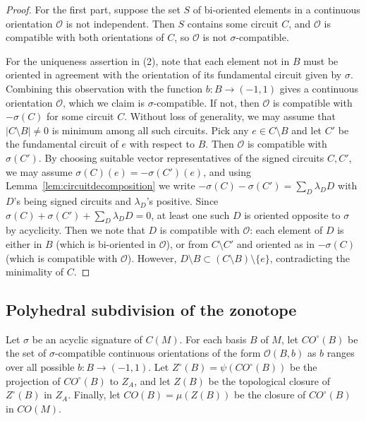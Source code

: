 \documentclass[12pt]{amsart}
\numberwithin{equation}{section}
\theoremstyle{definition}
\begin{document}
\begin{proof} For the first part, suppose the set $S$ of bi-oriented elements in a continuous orientation $\mathcal{O}$ is not independent. Then $S$ contains some circuit $C$, and $\mathcal{O}$ is compatible with both orientations of $C$, so $\mathcal{O}$ is not $\sigma$-compatible.

For the uniqueness assertion in (2), note that each element not in $B$ must be oriented in agreement with the orientation of its fundamental circuit given by $\sigma$. 
Combining this observation with the function $b : B \to (-1,1)$ gives a continuous orientation $\mathcal{O}$, which we claim is $\sigma$-compatible. If not, then $\mathcal{O}$ is compatible with $-\sigma(C)$ for some circuit $C$. Without loss of generality, we may assume that $|C\setminus B|\neq 0$ is minimum among all such circuits. Pick any $e\in C\setminus B$ and let $C'$ be the fundamental circuit of $e$ with respect to $B$. Then $\mathcal{O}$ is compatible with $\sigma(C')$. By choosing suitable vector representatives of the signed circuits $C,C'$, we may assume $\sigma(C)(e)=-\sigma(C')(e)$, and using Lemma~\ref{lem:circuitdecomposition} we write $-\sigma(C)-\sigma(C')=\sum_{D} \lambda_D D$ with $D$'s being signed circuits and $\lambda_D$'s positive. Since $\sigma(C)+\sigma(C')+\sum_{D} \lambda_D D=0$, at least one such $D$ is oriented opposite to $\sigma$ by acyclicity. Then we note that $D$ is compatible with $\mathcal{O}$: each element of $D$ is either in $B$ (which is bi-oriented in $\mathcal{O}$), or from $C\setminus C'$ and oriented as in $-\sigma(C)$ (which is compatible with $\mathcal{O}$). However, $D\setminus B\subset (C\setminus B)\setminus\{e\}$, contradicting the minimality of $C$.
\end{proof}


\subsection{Polyhedral subdivision of the zonotope}
\label{sec:polyhedralsubdivision}

Let $\sigma$ be an acyclic signature of $C(M)$.
For each basis $B$ of $M$, let $CO^\circ(B)$ be the set of $\sigma$-compatible continuous orientations of the form ${\mathcal O}(B,b)$ as $b$ ranges over all possible $b : B \to (-1,1)$.  Let $Z^\circ(B) = \psi(CO^\circ(B))$ be the projection of $CO^\circ(B)$ to $Z_A$, and let $Z(B)$ be the topological closure of $Z^\circ(B)$ in $Z_A$.  
Finally, let $CO(B) = \mu(Z(B))$ be the closure of $CO^\circ(B)$ in $CO(M)$.
\end{document}
